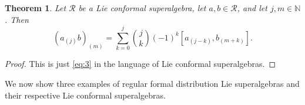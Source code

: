 \documentclass[a4paper, 12pt, reqno]{amsart}
\newtheorem{theorem}{Theorem}[section]
\theoremstyle{remark}
\begin{document}
\begin{theorem}
  \label{thr:10}
  Let $\mathcal{R}$ be a Lie conformal superalgebra, let $a, b \in \mathcal{R}$, and let $j, m \in \mathbb{N}$.
  Then
  \begin{equation*}
    (a_{(j)}b)_{(m)} = \sum_{k = 0}^j\binom{j}{k}(-1)^k[a_{(j - k)},b_{(m + k)}].
  \end{equation*}
\end{theorem}

\begin{proof}
  This is just \eqref{eq:3} in the language of Lie conformal superalgebras.
\end{proof}

We now show three examples of regular formal distribution Lie superalgebras and their respective Lie conformal superalgebras.
\end{document}
